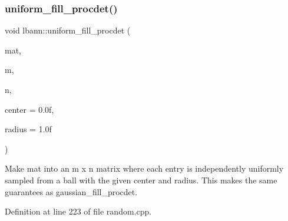 \subsubsection{\texorpdfstring{uniform\+\_\+fill\+\_\+procdet()}{uniform\_fill\_procdet()}}
{\footnotesize\ttfamily void lbann\+::uniform\+\_\+fill\+\_\+procdet (\begin{DoxyParamCaption}\item[{\hyperlink{base_8hpp_a9a697a504ae84010e7439ffec862b470}{Abs\+Dist\+Mat} \&}]{mat,  }\item[{El\+::\+Int}]{m,  }\item[{El\+::\+Int}]{n,  }\item[{Data\+Type}]{center = {\ttfamily 0.0f},  }\item[{Data\+Type}]{radius = {\ttfamily 1.0f} }\end{DoxyParamCaption})}

Make mat into an m x n matrix where each entry is independently uniformly sampled from a ball with the given center and radius. This makes the same guarantees as gaussian\+\_\+fill\+\_\+procdet. 

Definition at line 223 of file random.\+cpp.



